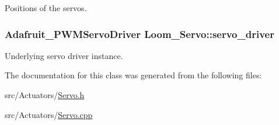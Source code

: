 Positions of the servos. 

\subsubsection[{\texorpdfstring{servo\+\_\+driver}{servo_driver}}]{\setlength{\rightskip}{0pt plus 5cm}Adafruit\+\_\+\+P\+W\+M\+Servo\+Driver Loom\+\_\+\+Servo\+::servo\+\_\+driver\hspace{0.3cm}{\ttfamily [protected]}}\hypertarget{class_loom___servo_ad002c8ffd5282b4e5b6127fc2c058e9f}{}\label{class_loom___servo_ad002c8ffd5282b4e5b6127fc2c058e9f}


Underlying servo driver instance. 



The documentation for this class was generated from the following files\+:\begin{DoxyCompactItemize}
\item 
src/\+Actuators/\hyperlink{_servo_8h}{Servo.\+h}\item 
src/\+Actuators/\hyperlink{_servo_8cpp}{Servo.\+cpp}\end{DoxyCompactItemize}
